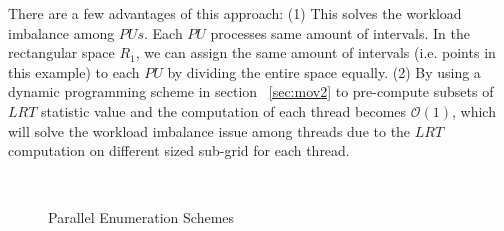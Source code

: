\documentclass[AMA,LATO1COL]{WileyNJD-v2}
\newcommand\bigo{\mathcal O}
\begin{document}
There are a few advantages of this approach: (1) This solves the workload imbalance among $PUs$. Each $PU$ processes same amount of intervals. In the rectangular space $R_1$, we can assign the same amount of intervals (i.e. points in this example) to each $PU$ by dividing the entire space equally. (2) By using a dynamic programming scheme in section ~\ref{sec:mov2} to pre-compute subsets of $LRT$ statistic value and the computation of each thread becomes $\bigo(1)$, which will solve the workload imbalance issue among threads due to the $LRT$ computation on different sized sub-grid for each thread.

\begin{figure}[t]
\centering
{}
~~\\
\caption{Parallel Enumeration Schemes\label{example1}}
\end{figure}

\begin{table}[!ht]
  \centering
  \caption{Example: PU assignment  }\label{exampletable}

\end{table}
\end{document}
